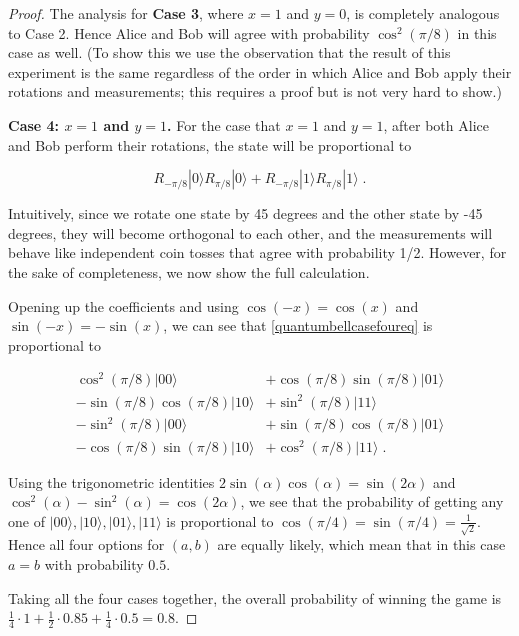 \begin{proof}
The analysis for \textbf{Case 3}, where \(x=1\) and \(y=0\), is
completely analogous to Case 2. Hence Alice and Bob will agree with
probability \(\cos^2(\pi/8)\) in this case as well. (To show this we use
the observation that the result of this experiment is the same
regardless of the order in which Alice and Bob apply their rotations and
measurements; this requires a proof but is not very hard to show.)

\textbf{Case 4: \(x=1\) and \(y=1\).} For the case that \(x=1\) and
\(y=1\), after both Alice and Bob perform their rotations, the state
will be proportional to

\[R_{-\pi/8}|0\rangle R_{\pi/8}|0 \rangle + R_{-\pi/8}|1\rangle R_{\pi/8}|1 \rangle \;. \label{quantumbellcasefoureq}\]

Intuitively, since we rotate one state by 45 degrees and the other state
by -45 degrees, they will become orthogonal to each other, and the
measurements will behave like independent coin tosses that agree with
probability 1/2. However, for the sake of completeness, we now show the
full calculation.

Opening up the coefficients and using \(\cos(-x)=\cos(x)\) and
\(\sin(-x)=-\sin(x)\), we can see that \eqref{quantumbellcasefoureq} is
proportional to

\[
\begin{aligned}
\cos^2(\pi/8)|00 \rangle &+ \cos(\pi/8)\sin(\pi/8)|01 \rangle \\
- \sin(\pi/8)\cos(\pi/8)|10\rangle  &+ \sin^2(\pi/8)|11 \rangle \\
-  \sin^2(\pi/8)|00 \rangle &+ \sin(\pi/8)\cos(\pi/8)|01 \rangle \\
-  \cos(\pi/8)\sin(\pi/8)|10\rangle  &+ \cos^2(\pi/8)|11 \rangle \;.
\end{aligned}
\]

Using the trigonometric identities
\(2\sin(\alpha)\cos(\alpha)= \sin(2\alpha)\) and
\(\cos^2(\alpha) - \sin^2(\alpha) = \cos(2\alpha)\), we see that the
probability of getting any one of
\(|00\rangle,|10\rangle,|01\rangle,|11\rangle\) is proportional to
\(\cos(\pi/4)=\sin(\pi/4)=\tfrac{1}{\sqrt{2}}\). Hence all four options
for \((a,b)\) are equally likely, which mean that in this case \(a=b\)
with probability \(0.5\).

Taking all the four cases together, the overall probability of winning
the game is
\(\tfrac{1}{4}\cdot 1 + \tfrac{1}{2}\cdot 0.85 + \tfrac{1}{4} \cdot 0.5 =0.8\).

\end{proof}

